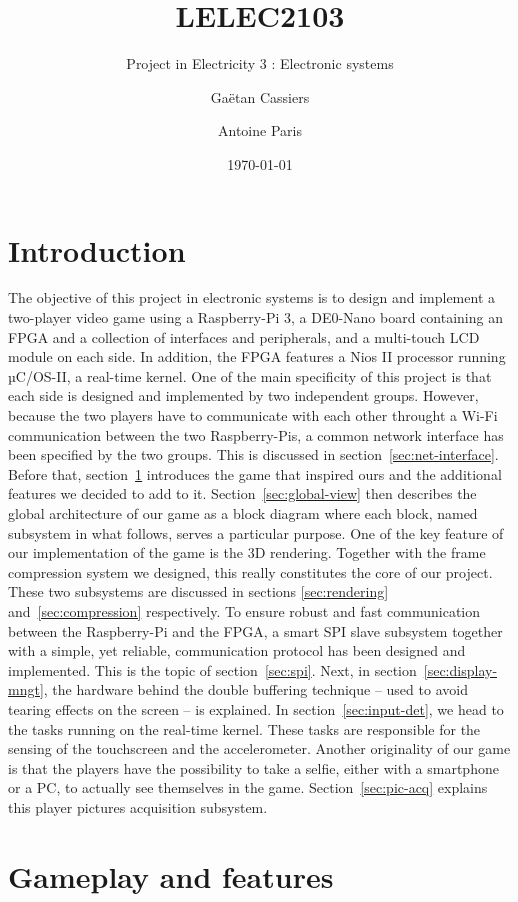 \documentclass[english, DIV=13]{scrartcl}
\title{LELEC2103}
\subtitle{Project in Electricity 3 : Electronic systems}
\author{Gaëtan Cassiers\and Antoine Paris}
\date{\today}
\begin{document}
\maketitle

\section*{Introduction}
The objective of this project in electronic systems is to design and implement a
two-player video game using a Raspberry-Pi 3, a DE0-Nano board containing an FPGA
and a collection of interfaces and peripherals, and a multi-touch LCD module on
each side. In addition, the FPGA features a Nios II processor running µC/OS-II, a
real-time kernel.
One of the main specificity of this project is that each side is designed and
implemented by two independent groups. However, because the two players have to
communicate with
each other throught a Wi-Fi communication between the two Raspberry-Pis, a common
network interface has been specified by the two groups. This is discussed
in section~\ref{sec:net-interface}. Before that, section~\ref{sec:gameplay-features}
introduces the game that inspired ours and the additional features we decided to
add to it. Section~\ref{sec:global-view} then describes the global architecture of
our game as a block diagram where each block, named subsystem in what follows, serves a
particular purpose. One of the key feature of our implementation of the game is the
3D rendering. Together with the frame compression system we designed, this really
constitutes the core of our project. These two subsystems are discussed in sections
\ref{sec:rendering} and~\ref{sec:compression} respectively.
To ensure robust and fast communication between the Raspberry-Pi and the FPGA, a smart
SPI slave subsystem together with a simple, yet reliable, communication protocol has
been designed and implemented. This is the topic of section~\ref{sec:spi}. Next, in
section~\ref{sec:display-mngt}, the hardware behind the double buffering technique
-- used to avoid tearing effects on the screen -- is explained.
In section~\ref{sec:input-det}, we head to the tasks running on the real-time kernel.
These tasks are responsible for the sensing of the touchscreen and the accelerometer.
Another originality of our game is that the players have the possibility to take a
selfie, either with a smartphone or a PC, to actually see themselves in the game.
Section~\ref{sec:pic-acq} explains this player pictures acquisition subsystem.

\section{Gameplay and features}
\label{sec:gameplay-features}
\end{document}
